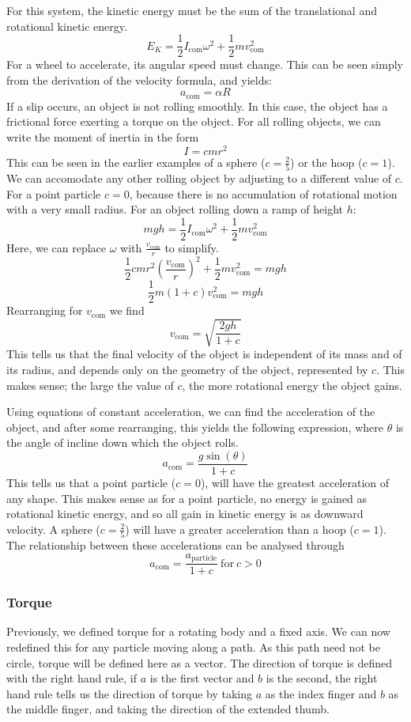 \documentclass[12pt]{report}
\begin{document}
\begin{flushleft}
\bigskip
For this system, the kinetic energy must be the sum of the translational and
rotational kinetic energy.
\[E_K = \frac{1}{2}I_\mathrm{com}\omega^2 + \frac{1}{2}mv^2_\mathrm{com}\]
For a wheel to accelerate, its angular speed must change. This can be seen
simply from the derivation of the velocity formula, and yields:
\[a_\mathrm{com} = \alpha R\]
If a slip occurs, an object is not rolling smoothly. In this case, the object
has a frictional force exerting a torque on the object. For all rolling 
objects, we can write the moment of inertia in the form
\[I = cmr^2\]
This can be seen in the earlier examples of a sphere (\(c = \frac{2}{5}\)) or
the hoop (\(c = 1\)). We can accomodate any other rolling object by adjusting
to a different value of \(c\). For a point particle \(c = 0\), because there is
no accumulation of rotational motion with a very small radius. For an object
rolling down a ramp of height \(h\):
\[mgh = \frac{1}{2}I_\mathrm{com}\omega^2 + \frac{1}{2}mv^2_\mathrm{com}\]
Here, we can replace \(\omega\) with \(\frac{v_\mathrm{com}}{r}\) to simplify.
\[\frac{1}{2}cmr^2\left(\frac{v_\mathrm{com}}{r}\right)^2+
\frac{1}{2}mv^2_\mathrm{com} = mgh\]
\[\frac{1}{2}m(1 + c)v^2_\mathrm{com} = mgh\]
Rearranging for \(v_\mathrm{com}\) we find
\[v_\mathrm{com} = \sqrt{\frac{2gh}{1 + c}}\]
This tells us that the final velocity of the object is independent of its mass
and of its radius, and depends only on the geometry of the object, represented
by \(c\). This makes sense; the large the value of \(c\), the more rotational
energy the object gains.

\bigskip
Using equations of constant acceleration, we can find the acceleration of the
object, and after some rearranging, this yields the following expression, where
\(\theta\) is the angle of incline down which the object rolls.
\[a_\mathrm{com} = \frac{g\sin(\theta)}{1 + c}\]
This tells us that a point particle (\(c = 0\)), will have the greatest 
acceleration of any shape. This makes sense as for a point particle, no energy
is gained as rotational kinetic energy, and so all gain in kinetic energy is as
downward velocity. A sphere (\(c = \frac{2}{5}\)) will have a greater 
acceleration than a hoop (\(c = 1\)). The relationship between these 
accelerations can be analysed through
\[a_\mathrm{com} = \frac{a_\mathrm{particle}}{1 + c} \:\mathrm{for}\: c > 0\]

\subsubsection*{Torque}
Previously, we defined torque for a rotating body and a fixed axis. We can now
redefined this for any particle moving along a path. As this path need not be 
circle, torque will be defined here as a vector. The direction of torque is 
defined with the right hand rule, if \(a\) is the first vector and \(b\) is the
second, the right hand rule tells us the direction of torque by taking \(a\) as
the index finger and \(b\) as the middle finger, and taking the direction of 
the extended thumb.


\end{flushleft}
\end{document}
